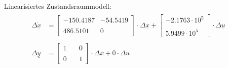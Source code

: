 \newline
Linearisiertes Zustandsraummodell:
\begin{align}
    \begin{split}
    \Delta\underline{\dot{x}} &= 
    \begin{bmatrix}
        -150.4187 & -54.5419 \\\\
        486.5101 & 0
    \end{bmatrix} \cdot \Delta \underline{x} +
    \begin{bmatrix}
        -2.1763\cdot 10^5 \\\\
        5.9499\cdot 10^5
    \end{bmatrix} \cdot
    \Delta \underline{u} \\\\
    \Delta \underline{y} &= 
    \begin{bmatrix}
        1 & \quad 0 \\\\
        0 & \quad 1
    \end{bmatrix} \cdot \Delta \underline{x} + \underline{0} \cdot \Delta\underline{u}
    \end{split}
    \label{eq:Gleichung16}
\end{align}

